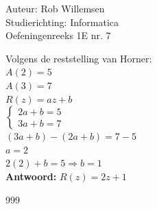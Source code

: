 \documentclass[a4paper]{article}
\begin{document}
\noindent \large Auteur: Rob Willemsen \\
\noindent \large Studierichting: Informatica\\
\noindent \large Oefeningenreeks 1E nr. 7\\

\medskip

\normalsize

Volgens de reststelling van Horner: \\

$A(2) = 5$ \\

$A(3) = 7$ \\

$R(z) = az + b$ \\

$\left\{
\begin{array}{l}
2a + b = 5 \\
3a + b = 7
\end{array}
\right.$ \\

$(3a + b) - (2a + b) = 7 - 5$ \\

$a = 2$ \\

$2(2) + b = 5 \Rightarrow b = 1$ \\

\textbf{Antwoord:} $R(z) = 2z + 1$ \\

\begin{thebibliography}{999}
\end{thebibliography}
\end{document}
